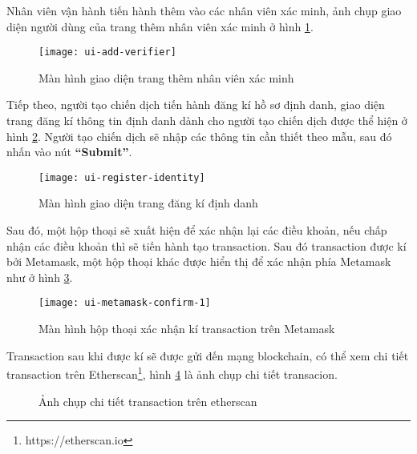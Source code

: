 \documentclass[../main-report.tex]{subfiles}
\begin{document}
Nhân viên vận hành tiến hành thêm vào các nhân viên xác minh, ảnh chụp giao diện người dùng của trang thêm nhân viên xác minh ở hình \ref{fig:ui-add-verifier}.

\begin{figure}[ht!]
\begin{center}
\label{fig:ui-add-verifier}
\texttt{[image: ui-add-verifier]}
\caption{Màn hình giao diện trang thêm nhân viên xác minh}
\end{center}
\end{figure}

Tiếp theo, người tạo chiến dịch tiến hành đăng kí hồ sơ định danh, giao diện trang đăng kí thông tin định danh dành cho người tạo chiến dịch được thể hiện ở hình \ref{fig:ui-register-identity}. Người tạo chiến dịch sẽ nhập các thông tin cần thiết theo mẫu, sau đó nhấn vào nút \textbf{``Submit''}.

\begin{figure}[ht!]
\begin{center}
\label{fig:ui-register-identity}
\texttt{[image: ui-register-identity]}
\caption{Màn hình giao diện trang đăng kí định danh}
\end{center}
\end{figure}

Sau đó, một hộp thoại sẽ xuất hiện để xác nhận lại các điều khoản, nếu chấp nhận các điều khoản thì sẽ tiến hành tạo \gls{transaction}. Sau đó transaction được kí bởi Metamask, một hộp thoại khác được hiển thị để xác nhận phía Metamask như ở hình \ref{fig:ui-metamask-confirm-1}.


\begin{figure}[ht!]
\begin{center}
\label{fig:ui-metamask-confirm-1}
\texttt{[image: ui-metamask-confirm-1]}
\caption{Màn hình hộp thoại xác nhận kí transaction trên Metamask}
\end{center}
\end{figure}

Transaction sau khi được kí sẽ được gửi đến mạng blockchain, có thể xem chi tiết transaction trên Etherscan\footnote{https://etherscan.io}, hình \ref{fig:ui-transaction-detail} là ảnh chụp chi tiết transacion.

\begin{figure}[ht!]
\begin{center}
\label{fig:ui-transaction-detail}
\caption{Ảnh chụp chi tiết transaction trên etherscan}
\end{center}
\end{figure}
\end{document}
